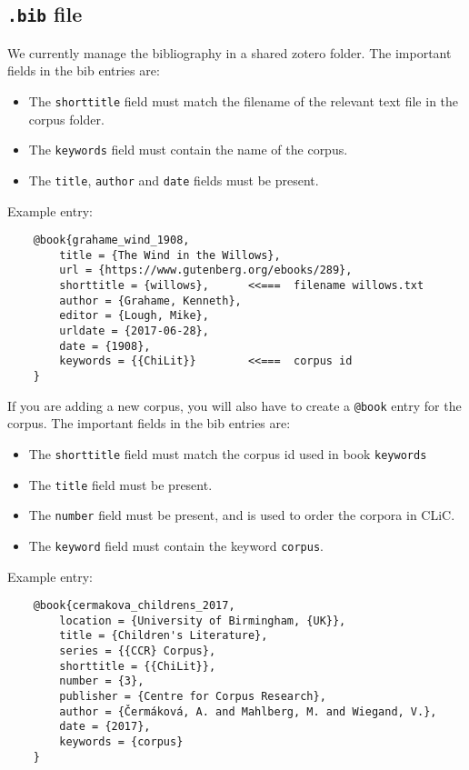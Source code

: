 \documentclass[a4paper,10pt]{paper}
\begin{document}
\subsection{\texttt{.bib} file} \label{se:bib_file}
We currently manage the bibliography in a shared zotero folder.
The important fields in the bib entries are:
\begin{itemize}
    \item The \texttt{shorttitle} field must match the filename of the relevant text file in the corpus folder.
    \item The \texttt{keywords} field must contain the name of the corpus.
    \item The \texttt{title}, \texttt{author} and \texttt{date} fields must be present.
\end{itemize}    
Example entry:
\begin{verbatim}
    @book{grahame_wind_1908,
        title = {The Wind in the Willows},
        url = {https://www.gutenberg.org/ebooks/289},
        shorttitle = {willows},      <<===  filename willows.txt
        author = {Grahame, Kenneth},
        editor = {Lough, Mike},
        urldate = {2017-06-28},
        date = {1908},
        keywords = {{ChiLit}}        <<===  corpus id
    }
\end{verbatim}
If you are adding a new corpus, you will also have to create a \texttt{@book} entry for the corpus.
The important fields in the bib entries are:
\begin{itemize}
    \item The \texttt{shorttitle} field must match the corpus id used in book \texttt{keywords}
    \item The \texttt{title} field must be present.
    \item The \texttt{number} field must be present, and is used to order the corpora in CLiC.
    \item The \texttt{keyword} field must contain the keyword \texttt{corpus}.
\end{itemize}
Example entry:
\begin{verbatim}
    @book{cermakova_childrens_2017,
        location = {University of Birmingham, {UK}},
        title = {Children's Literature},
        series = {{CCR} Corpus},
        shorttitle = {{ChiLit}},
        number = {3},
        publisher = {Centre for Corpus Research},
        author = {Čermáková, A. and Mahlberg, M. and Wiegand, V.},
        date = {2017},
        keywords = {corpus}
    }
\end{verbatim}
\end{document}
